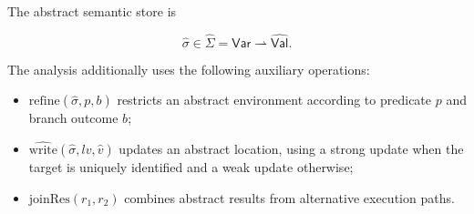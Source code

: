 \documentclass[11pt,oneside]{report}
\theoremstyle{plain}
\theoremstyle{definition}
\theoremstyle{remark}
\begin{document}
The abstract semantic store is

$$ \hat{\sigma} \in \widehat{\Sigma} = \mathsf{Var} \rightharpoonup \widehat{\mathsf{Val}}. $$

The analysis additionally uses the following auxiliary operations:

\begin{itemize}

\item \(\mathrm{refine}(\hat{\sigma},p,b)\) restricts an abstract environment according to predicate \(p\) and branch outcome \(b\);

\item \(\widehat{\mathrm{write}}(\hat{\sigma},lv,\hat{v})\) updates an abstract location, using a strong update when the target is uniquely identified and a weak update otherwise;

\item \(\mathrm{joinRes}(r_1,r_2)\) combines abstract results from alternative execution paths.

\end{itemize}
\end{document}
